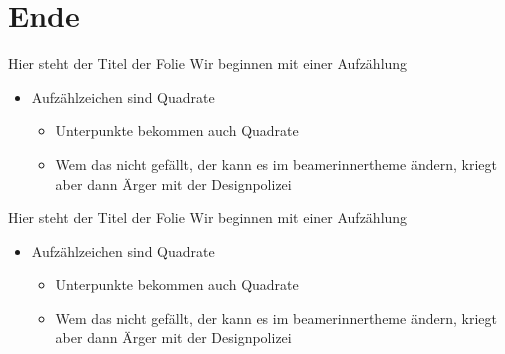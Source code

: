 \documentclass[fleqn,10pt,t,tocinheader,widetoc]{beamer}
\begin{document}
\section{Ende}

\begin{frame}{Hier steht der Titel der Folie}
Wir beginnen mit einer Aufzählung
\begin{itemize}
\item Aufzählzeichen sind Quadrate
\begin{itemize}
\item Unterpunkte bekommen auch Quadrate
\item Wem das nicht gefällt, der kann es im beamerinnertheme ändern,
  kriegt aber dann Ärger mit der Designpolizei
\end{itemize}
\end{itemize}

\end{frame}

\begin{frame}{Hier steht der Titel der Folie}
Wir beginnen mit einer Aufzählung
\begin{itemize}
\item Aufzählzeichen sind Quadrate
\begin{itemize}
\item Unterpunkte bekommen auch Quadrate
\item Wem das nicht gefällt, der kann es im beamerinnertheme ändern,
  kriegt aber dann Ärger mit der Designpolizei
\end{itemize}
\end{itemize}

\end{frame}
\end{document}
